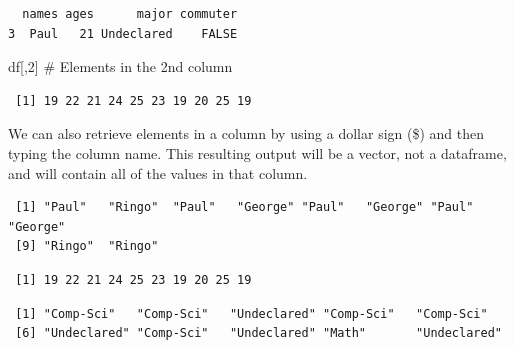 \documentclass[
  letterpaper,
  DIV=11,
  numbers=noendperiod]{scrreprt}
\newenvironment{Shaded}{\begin{snugshade}}{\end{snugshade}}
\newcommand{\CommentTok}[1]{\textcolor[rgb]{0.37,0.37,0.37}{#1}}
\newcommand{\DecValTok}[1]{\textcolor[rgb]{0.68,0.00,0.00}{#1}}
\newcommand{\NormalTok}[1]{\textcolor[rgb]{0.00,0.23,0.31}{#1}}
\newcommand{\SpecialCharTok}[1]{\textcolor[rgb]{0.37,0.37,0.37}{#1}}
\begin{document}
\begin{verbatim}
  names ages      major commuter
3  Paul   21 Undeclared    FALSE
\end{verbatim}

\begin{Shaded}
\begin{Highlighting}[]
\NormalTok{df[,}\DecValTok{2}\NormalTok{] }\CommentTok{\# Elements in the 2nd column}
\end{Highlighting}
\end{Shaded}

\begin{verbatim}
 [1] 19 22 21 24 25 23 19 20 25 19
\end{verbatim}

We can also retrieve elements in a column by using a dollar sign (\$)
and then typing the column name. This resulting output will be a vector,
not a dataframe, and will contain all of the values in that column.

\begin{Shaded}
\end{Shaded}

\begin{verbatim}
 [1] "Paul"   "Ringo"  "Paul"   "George" "Paul"   "George" "Paul"   "George"
 [9] "Ringo"  "Ringo" 
\end{verbatim}

\begin{Shaded}
\end{Shaded}

\begin{verbatim}
 [1] 19 22 21 24 25 23 19 20 25 19
\end{verbatim}

\begin{Shaded}
\end{Shaded}

\begin{verbatim}
 [1] "Comp-Sci"   "Comp-Sci"   "Undeclared" "Comp-Sci"   "Comp-Sci"  
 [6] "Undeclared" "Comp-Sci"   "Undeclared" "Math"       "Undeclared"
\end{verbatim}
\end{document}
